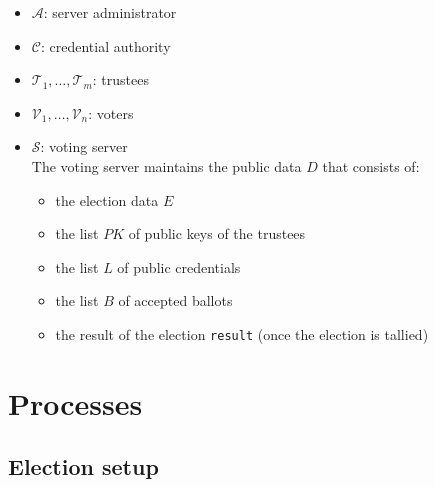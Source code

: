 \documentclass[a4paper]{article}
\newcommand{\result}{\texttt{result}}
\begin{document}
\begin{itemize}
\item $\mathcal{A}$: server administrator
\item $\mathcal{C}$: credential authority
\item $\mathcal{T}_1,\dots,\mathcal{T}_m$: trustees
\item $\mathcal{V}_1,\dots,\mathcal{V}_n$: voters
\item $\mathcal{S}$: voting server \\
  The voting server maintains the public data $D$ that
consists of:
  \begin{itemize}
  \item the election data $E$
  \item the list $PK$ of public keys of the trustees
  \item the list $L$ of public credentials
  \item the list $B$ of accepted ballots
  \item the result of the election {\result} (once the election is tallied)
  \end{itemize}
\end{itemize}

\section{Processes}
\label{processes}

\subsection{Election setup}
\label{election-setup}
\end{document}
